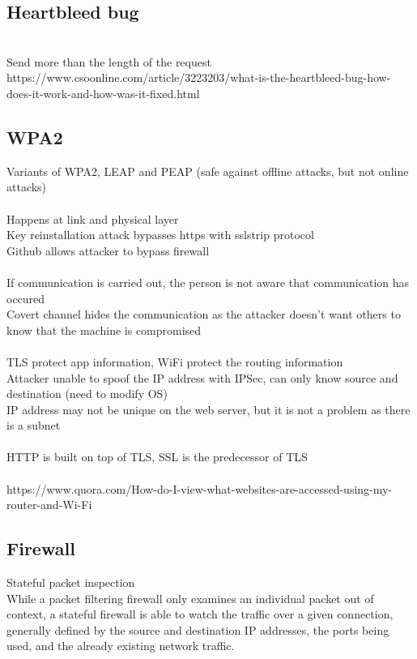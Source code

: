 \documentclass[11pt]{article}
\begin{document}
\begin{multicols*}{3}
\subsection*{Heartbleed bug}\\
Send more than the length of the request
\textcolor{link}{https://www.csoonline.com/article/3223203/what-is-the-heartbleed-bug-how-does-it-work-and-how-was-it-fixed.html}
\subsection*{WPA2}
Variants of WPA2, LEAP and PEAP (safe against offline attacks, but not online attacks)\\\\
Happens at link and physical layer\\
Key reinstallation attack bypasses https with sslstrip protocol\\
Github allows attacker to bypass firewall\\\\
If communication is carried out, the person is not aware that communication has occured\\
Covert channel hides the communication as the attacker doesn't want others to know that the machine is compromised
\\\\
TLS protect app information, WiFi protect the routing information\\
Attacker unable to spoof the IP address with IPSec, can only know source and destination (need to modify OS)\\
IP address may not be unique on the web server, but it is not a problem as there is a subnet\\\\
HTTP is built on top of TLS, SSL is the predecessor of TLS\\\\
\textcolor{link}{https://www.quora.com/How-do-I-view-what-websites-are-accessed-using-my-router-and-Wi-Fi}
\subsection*{Firewall}
Stateful packet inspection\\
While a packet filtering firewall only examines an individual packet out of context, a stateful firewall is able to watch the traffic over a given connection, generally defined by the source and destination IP addresses, the ports being used, and the already existing network traffic.

\end{multicols*}
\end{document}
